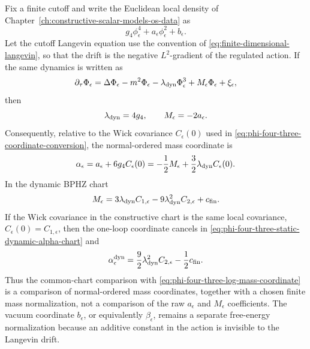 \begin{proposition}
\label{prop:phi-four-three-static-dynamic-mass-chart}
Fix a finite cutoff and write the Euclidean local density of
Chapter~\ref{ch:constructive-scalar-models-os-data} as
\[
  g_4\phi_\epsilon^4+a_\epsilon\phi_\epsilon^2+b_\epsilon .
\]
Let the cutoff Langevin equation use the convention of
\eqref{eq:finite-dimensional-langevin}, so that the drift is the negative
\(L^2\)-gradient of the regulated action.  If the same dynamics is written as
\[
  \partial_\tau\Phi_\epsilon
  =
  \Delta\Phi_\epsilon-m^2\Phi_\epsilon
  -\lambda_{\rm dyn}\Phi_\epsilon^3
  +M_\epsilon\Phi_\epsilon
  +\xi_\epsilon ,
\]
then
\begin{equation}
  \lambda_{\rm dyn}=4g_4,
  \qquad
  M_\epsilon=-2a_\epsilon .
  \label{eq:phi-four-three-static-dynamic-raw-coordinate}
\end{equation}
Consequently, relative to the Wick covariance \(C_\epsilon(0)\) used in
\eqref{eq:phi-four-three-coordinate-conversion}, the normal-ordered mass
coordinate is
\begin{equation}
  \alpha_\epsilon
  =
  a_\epsilon+6g_4C_\epsilon(0)
  =
  -\frac12M_\epsilon
  +\frac32\lambda_{\rm dyn}C_\epsilon(0).
  \label{eq:phi-four-three-static-dynamic-alpha-chart}
\end{equation}
In the dynamic BPHZ chart
\[
  M_\epsilon
  =
  3\lambda_{\rm dyn}C_{1,\epsilon}
  -9\lambda_{\rm dyn}^2C_{2,\epsilon}
  +c_{\rm fin}.
\]
If the Wick covariance in the constructive chart is the same local covariance,
\(C_\epsilon(0)=C_{1,\epsilon}\), then the one-loop coordinate cancels in
\eqref{eq:phi-four-three-static-dynamic-alpha-chart} and
\begin{equation}
  \alpha_\epsilon^{\rm dyn}
  =
  \frac92\lambda_{\rm dyn}^2C_{2,\epsilon}
  -\frac12c_{\rm fin}.
  \label{eq:phi-four-three-dynamic-normal-mass-coordinate}
\end{equation}
Thus the common-chart comparison with
\eqref{eq:phi-four-three-log-mass-coordinate} is a comparison of
normal-ordered mass coordinates, together with a chosen finite mass
normalization, not a comparison of the raw \(a_\epsilon\) and \(M_\epsilon\)
coefficients.  The vacuum coordinate \(b_\epsilon\), or equivalently
\(\beta_\epsilon\), remains a separate free-energy normalization because an
additive constant in the action is invisible to the Langevin drift.
\end{proposition}

